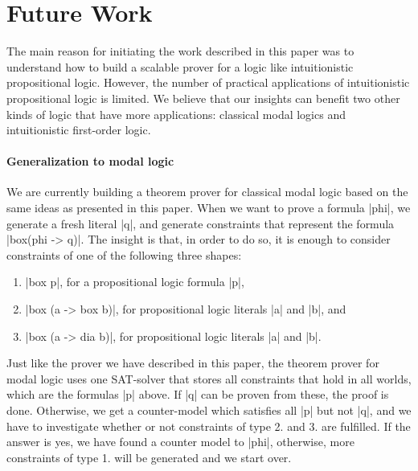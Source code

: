 \documentclass{llncs}
\begin{document}




\section{Future Work}

The main reason for initiating the work described in this paper was to understand how to build a scalable prover for a logic like intuitionistic propositional logic. However, the number of practical applications of intuitionistic propositional logic is limited. We believe that our insights can benefit two other kinds of logic that have more applications: classical modal logics and intuitionistic first-order logic.

\paragraph{Generalization to modal logic}
We are currently building a theorem prover for classical modal logic based on the same ideas as presented in this paper. When we want to prove a formula |phi|, we generate a fresh literal |q|, and generate constraints that represent the formula |box(phi -> q)|. The insight is that, in order to do so, it is enough to consider constraints of one of the following three shapes:
\begin{enumerate}
\item |box p|, for a propositional logic formula |p|,
\item |box (a -> box b)|, for propositional logic literals |a| and |b|, and
\item |box (a -> dia b)|, for propositional logic literals |a| and |b|.
\end{enumerate}
Just like the prover we have described in this paper, the theorem prover for modal
logic uses one SAT-solver that stores all constraints that hold in all worlds, which are the formulas |p| above. If |q| can be proven from these, the proof is done. Otherwise, we get a counter-model which satisfies all |p| but not |q|, and we have to investigate whether or not constraints of type 2. and 3. are fulfilled. If the answer is yes, we have found a counter model to |phi|, otherwise, more constraints of type 1. will be generated and we start over.
\end{document}

